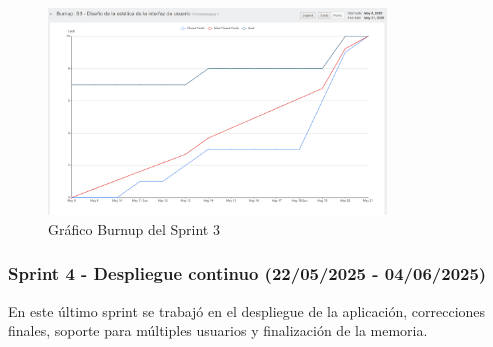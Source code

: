 \begin{figure}[H]
\centering
\includegraphics[width=0.8\textwidth]{img/BurnupS3.png}
\caption{Gráfico Burnup del Sprint 3}
\label{fig:BurnupS3}
\end{figure}

\subsubsection{Sprint 4 - Despliegue continuo (22/05/2025 - 04/06/2025)}

En este último sprint se trabajó en el despliegue de la aplicación, correcciones finales, soporte para múltiples usuarios y finalización de la memoria.

